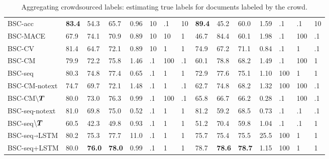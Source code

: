 \begin{table}
\begin{tabularx}{\textwidth}{p{3.05cm} X X X X P{0.27cm} P{0.27cm} P{0.27cm} X X X X P{0.27cm}  P{0.27cm}  P{0.27cm} }
BSC-acc & \textbf{83.4} & 54.3 & 65.7 & %
0.96 & 10 & .1 & 10 & \textbf{89.4} & 45.2 & 60.0 & %
1.59 & .1 & .1 & 10 \\ 
BSC-MACE & 67.9 & 74.1 & 70.9 & %
0.89 & 10 & 10 & 1 & 46.7 & 84.4 & 60.1 & %
 1.98 & .1 & 100 & .1\\ 
BSC-CV & 81.4 & 64.7 & 72.1 & %
0.89 & 10 & 1 & 1 & 74.9 & 67.2 & 71.1 & %
 0.84 & .1 & 1 & .1\\ 
BSC-CM & 79.9 & 72.2 & 75.8 & %
1.46 & .1 & 100 & .1 & 60.1 & 78.8 & 68.2 & %
1.49 & .1 & 100 & 1 \\ 
BSC-seq & 80.3 & 74.8 & 77.4 & %
0.65 & .1 & 1 & 1 & 
72.9 & 77.6 & 75.1 & %
1.10 & 100 & 1 & 1\\ \midrule

BSC-CM-notext & 74.7 & 69.7 & 72.1 & 1.48 & .1 & 1 & .1 & 62.7 & 74.8 & 68.2 & 1.32 & 100 & 100 & .1 \\
BSC-CM$\backslash\boldsymbol T$ & 80.0 & 73.0 & 76.3 & 0.99 & .1 & 100 & .1 & 65.8 & 66.7 & 66.2 & 0.28 & .1 & 100 & .1  \\
BSC-seq-notext & 81.0 & 69.8 & 75.0 & %
0.52 & .1 & 1 & 1 & 81.2 & 59.2 & 68.5 & %
 0.73 & .1 & .1 & .1\\ 
BSC-seq$\backslash\boldsymbol T$ & 60.5 & 42.3 & 49.8 & 0.93 & .1 & 1 & 1 & 51.2 & 70.4 & 59.8 & 1.04 & .1 & .1 & 1\\\midrule

BSC-seq$\Arrow{0.2cm}$LSTM & %
80.2 & 75.3 & 77.7 & 11.0 
& .1 & 1 & 1 & 
75.7 & 75.4 & 75.5 & %
25.5 & 100 & 1 & 1 \\
BSC-seq+LSTM & 
80.0 & \textbf{76.0} & \textbf{78.0} & 0.99 %
& .1 & 1 & 1 & 
78.7 & \textbf{78.6} & \textbf{78.7} & %
1.15 & 100 & 1 & 1 \\ %
\bottomrule
\end{tabularx}
\caption{Aggregating crowdsourced labels: estimating true labels for documents labeled by the crowd.}
\label{tab:aggregation_results}
\npnoround
\end{table}
